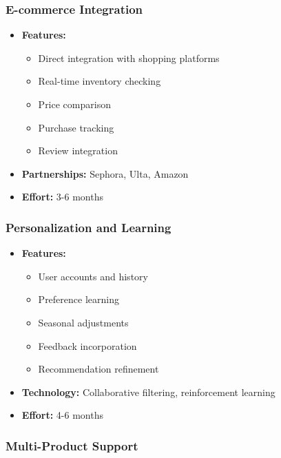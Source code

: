 \subsubsection{E-commerce Integration}

\begin{itemize}
    \item \textbf{Features:}
    \begin{itemize}
        \item Direct integration with shopping platforms
        \item Real-time inventory checking
        \item Price comparison
        \item Purchase tracking
        \item Review integration
    \end{itemize}
    \item \textbf{Partnerships:} Sephora, Ulta, Amazon
    \item \textbf{Effort:} 3-6 months
\end{itemize}

\subsubsection{Personalization and Learning}

\begin{itemize}
    \item \textbf{Features:}
    \begin{itemize}
        \item User accounts and history
        \item Preference learning
        \item Seasonal adjustments
        \item Feedback incorporation
        \item Recommendation refinement
    \end{itemize}
    \item \textbf{Technology:} Collaborative filtering, reinforcement learning
    \item \textbf{Effort:} 4-6 months
\end{itemize}

\subsubsection{Multi-Product Support}


